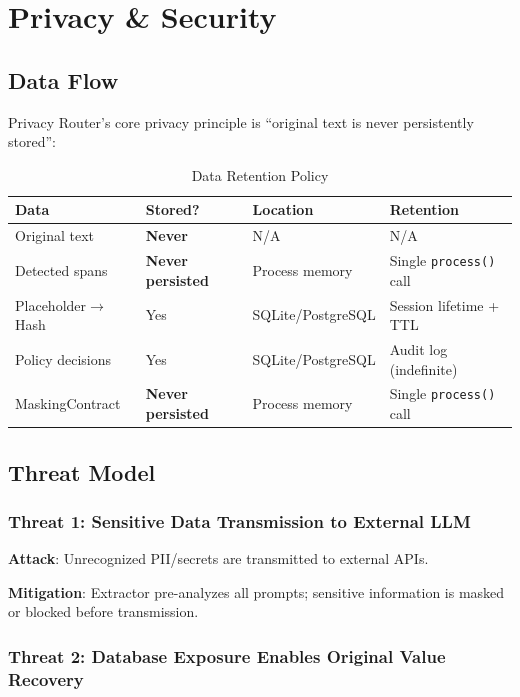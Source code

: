 \documentclass[11pt,a4paper]{article}
\begin{document}
\section{Privacy \& Security}

\subsection{Data Flow}

Privacy Router's core privacy principle is ``original text is never persistently stored'':

\begin{table}[h]
\centering
\begin{tabular}{@{}llll@{}}
\toprule
Data & Stored? & Location & Retention \\
\midrule
Original text & \textbf{Never} & N/A & N/A \\
Detected spans & \textbf{Never persisted} & Process memory & Single \texttt{process()} call \\
Placeholder$\rightarrow$Hash & Yes & SQLite/PostgreSQL & Session lifetime + TTL \\
Policy decisions & Yes & SQLite/PostgreSQL & Audit log (indefinite) \\
MaskingContract & \textbf{Never persisted} & Process memory & Single \texttt{process()} call \\
\bottomrule
\end{tabular}
\caption{Data Retention Policy}
\end{table}

\subsection{Threat Model}

\subsubsection{Threat 1: Sensitive Data Transmission to External LLM}

\textbf{Attack}: Unrecognized PII/secrets are transmitted to external APIs.

\textbf{Mitigation}: Extractor pre-analyzes all prompts; sensitive information is masked or blocked before transmission.

\subsubsection{Threat 2: Database Exposure Enables Original Value Recovery}
\end{document}
